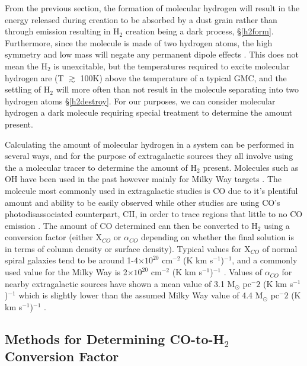 From the previous section, the formation of molecular hydrogen will result in the energy released during creation to be absorbed by a dust grain rather than through emission resulting in H$_2$ creation being a dark process, \S\ref{h2form}.  Furthermore, since the molecule is made of two hydrogen atoms, the high symmetry and low mass will negate any permanent dipole effects \citep{bolatto2013,kennicutt2012}.  This does not mean the H$_2$ is unexcitable, but the temperatures required to excite molecular hydrogen are (T $\gtrsim$ 100K) above the temperature of a typical GMC\citep{bolatto2013}, and the settling of H$_2$ will more often than not result in the molecule separating into two hydrogen atoms \S\ref{h2destroy}.  For our purposes, we can consider molecular hydrogen a dark molecule requiring special treatment to determine the amount present.

Calculating the amount of molecular hydrogen in a system can be performed in several ways, and for the purpose of extragalactic sources they all involve using the  a molecular tracer to determine the amount of H$_2$ present.  Molecules such as OH have been used in the past however mainly for Milky Way targets \citep{barrett1964}.  The molecule most commonly used in extragalactic studies is CO due to it's plentiful amount and ability to be easily observed \citep{bolatto2013} while other studies are using CO's photodisassociated counterpart, CII, in order to trace regions that little to no CO emission \citep{madden1997}.  The amount of CO determined can then be converted to H$_2$ using a conversion factor (either X$_{CO}$ or $\alpha_{CO}$ depending on whether the final solution is in terms of column density or surface density).  Typical values for X$_{CO}$ of normal spiral galaxies tend to be around 1-4$\times 10^{20}$ cm$^{-2}$ (K km s$^{-1}$)$^{-1}$, and a commonly used value for the Milky Way is 2$\times 10^{20}$ cm$^{-2}$ (K km s$^{-1}$)$^{-1}$ \citep{bolatto2013}. Values of $\alpha_{CO}$ for nearby extragalactic sources have shown a mean value of 3.1 M$_\odot$ pc$^-2$ (K km s$^{-1}$)$^{-1}$ which is slightly lower than the assumed Milky Way value of 4.4 M$_\odot$ pc$^-2$ (K km s$^{-1}$)$^{-1}$ \citep{sandstrom2013}.

\subsection{Methods for Determining CO-to-H$_2$ Conversion Factor}

